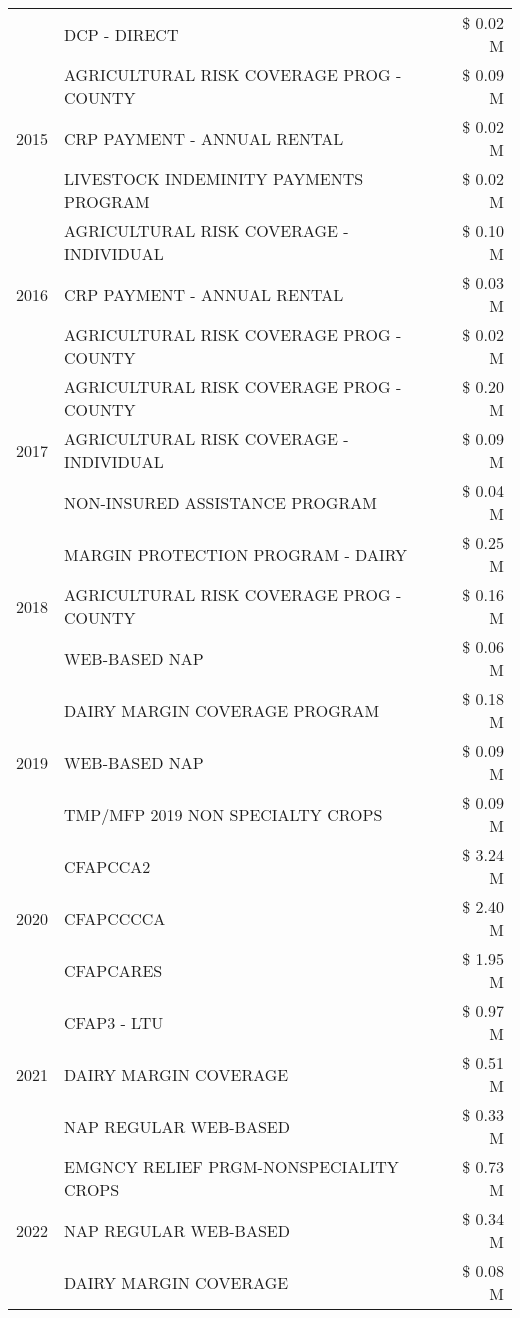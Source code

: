 \begin{tabular}{llr}
 & DCP - DIRECT & \$ 0.02 M \\
\cline{1-3}
\multirow[t]{3}{*}{2015} & AGRICULTURAL RISK COVERAGE PROG - COUNTY & \$ 0.09 M \\
 & CRP PAYMENT - ANNUAL RENTAL & \$ 0.02 M \\
 & LIVESTOCK INDEMINITY PAYMENTS PROGRAM & \$ 0.02 M \\
\cline{1-3}
\multirow[t]{3}{*}{2016} & AGRICULTURAL RISK COVERAGE - INDIVIDUAL & \$ 0.10 M \\
 & CRP PAYMENT - ANNUAL RENTAL & \$ 0.03 M \\
 & AGRICULTURAL RISK COVERAGE PROG - COUNTY & \$ 0.02 M \\
\cline{1-3}
\multirow[t]{3}{*}{2017} & AGRICULTURAL RISK COVERAGE PROG - COUNTY & \$ 0.20 M \\
 & AGRICULTURAL RISK COVERAGE - INDIVIDUAL & \$ 0.09 M \\
 & NON-INSURED ASSISTANCE PROGRAM & \$ 0.04 M \\
\cline{1-3}
\multirow[t]{3}{*}{2018} & MARGIN PROTECTION PROGRAM - DAIRY & \$ 0.25 M \\
 & AGRICULTURAL RISK COVERAGE PROG - COUNTY & \$ 0.16 M \\
 & WEB-BASED NAP & \$ 0.06 M \\
\cline{1-3}
\multirow[t]{3}{*}{2019} & DAIRY MARGIN COVERAGE PROGRAM & \$ 0.18 M \\
 & WEB-BASED NAP & \$ 0.09 M \\
 & TMP/MFP 2019 NON SPECIALTY CROPS & \$ 0.09 M \\
\cline{1-3}
\multirow[t]{3}{*}{2020} & CFAPCCA2 & \$ 3.24 M \\
 & CFAPCCCCA & \$ 2.40 M \\
 & CFAPCARES & \$ 1.95 M \\
\cline{1-3}
\multirow[t]{3}{*}{2021} & CFAP3 - LTU & \$ 0.97 M \\
 & DAIRY MARGIN COVERAGE & \$ 0.51 M \\
 & NAP REGULAR WEB-BASED & \$ 0.33 M \\
\cline{1-3}
\multirow[t]{3}{*}{2022} & EMGNCY RELIEF PRGM-NONSPECIALITY CROPS & \$ 0.73 M \\
 & NAP REGULAR WEB-BASED & \$ 0.34 M \\
 & DAIRY MARGIN COVERAGE & \$ 0.08 M \\
\cline{1-3}
\bottomrule
\end{tabular}
